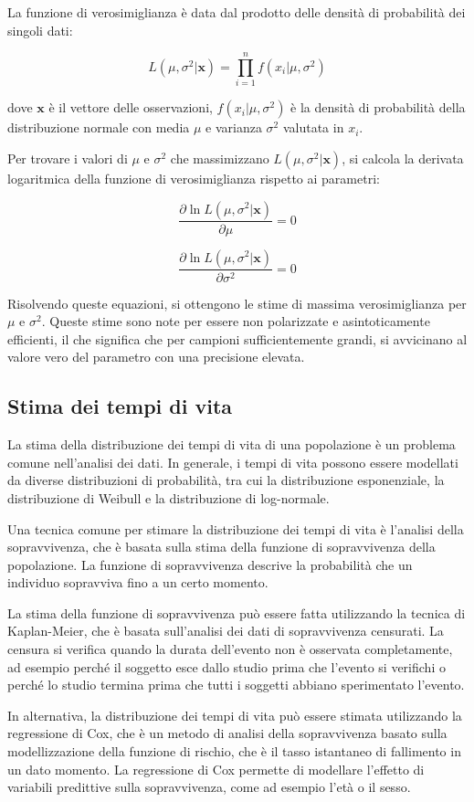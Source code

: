 La funzione di verosimiglianza è data dal prodotto delle densità di probabilità dei singoli dati:

$$L(\mu,\sigma^2|\mathbf{x})=\prod_{i=1}^n f(x_i|\mu,\sigma^2)$$

dove $\mathbf{x}$ è il vettore delle osservazioni, $f(x_i|\mu,\sigma^2)$ è la densità di probabilità della distribuzione normale con media $\mu$ e varianza $\sigma^2$ valutata in $x_i$.

Per trovare i valori di $\mu$ e $\sigma^2$ che massimizzano $L(\mu,\sigma^2|\mathbf{x})$, si calcola la derivata logaritmica della funzione di verosimiglianza rispetto ai parametri:

$$\frac{\partial \ln L(\mu,\sigma^2|\mathbf{x})}{\partial \mu}=0$$

$$\frac{\partial \ln L(\mu,\sigma^2|\mathbf{x})}{\partial \sigma^2}=0$$

Risolvendo queste equazioni, si ottengono le stime di massima verosimiglianza per $\mu$ e $\sigma^2$. Queste stime sono note per essere non polarizzate e asintoticamente efficienti, il che significa che per campioni sufficientemente grandi, si avvicinano al valore vero del parametro con una precisione elevata.

\subsection{Stima dei tempi di vita}
La stima della distribuzione dei tempi di vita di una popolazione è un problema comune nell'analisi dei dati. In generale, i tempi di vita possono essere modellati da diverse distribuzioni di probabilità, tra cui la distribuzione esponenziale, la distribuzione di Weibull e la distribuzione di log-normale.

Una tecnica comune per stimare la distribuzione dei tempi di vita è l'analisi della sopravvivenza, che è basata sulla stima della funzione di sopravvivenza della popolazione. La funzione di sopravvivenza descrive la probabilità che un individuo sopravviva fino a un certo momento.

La stima della funzione di sopravvivenza può essere fatta utilizzando la tecnica di Kaplan-Meier, che è basata sull'analisi dei dati di sopravvivenza censurati. La censura si verifica quando la durata dell'evento non è osservata completamente, ad esempio perché il soggetto esce dallo studio prima che l'evento si verifichi o perché lo studio termina prima che tutti i soggetti abbiano sperimentato l'evento.

In alternativa, la distribuzione dei tempi di vita può essere stimata utilizzando la regressione di Cox, che è un metodo di analisi della sopravvivenza basato sulla modellizzazione della funzione di rischio, che è il tasso istantaneo di fallimento in un dato momento. La regressione di Cox permette di modellare l'effetto di variabili predittive sulla sopravvivenza, come ad esempio l'età o il sesso.

